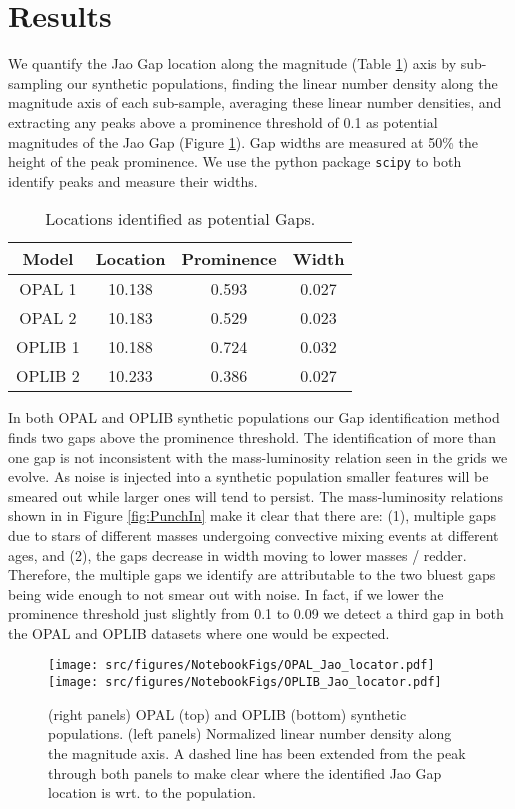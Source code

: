 \section{Results}\label{sec:results}
We quantify the Jao Gap location along the magnitude (Table
\ref{tab:GapLocation}) axis by sub-sampling our synthetic populations, finding
the linear number density along the magnitude axis of each sub-sample,
averaging these linear number densities, and extracting any peaks above a
prominence threshold of 0.1 as potential magnitudes of the Jao Gap (Figure
\ref{fig:JaoGapLocator}). Gap widths are measured at 50\% the height of the peak
prominence. We use the python package \texttt{scipy} \citep{2020SciPy-NMeth} to
both identify peaks and measure their widths. 

\begin{table}
	\centering
	\begin{tabular}{c | c c c}
		\hline
		Model & Location & Prominence & Width\\
		\hline
		\hline
		OPAL 1 & 10.138 & 0.593 & 0.027 \\
		OPAL 2 & 10.183 & 0.529 & 0.023 \\
		OPLIB 1 & 10.188 & 0.724 & 0.032 \\
		OPLIB 2 & 10.233 & 0.386 & 0.027 
	\end{tabular}
	\caption{Locations identified as potential Gaps.}
	\label{tab:GapLocation}
\end{table}

In both OPAL and OPLIB synthetic populations our Gap identification method
finds two gaps above the prominence threshold. The identification of more than
one gap is not inconsistent with the mass-luminosity relation seen in the grids
we evolve. As noise is injected into a synthetic population smaller features will
be smeared out while larger ones will tend to persist. The mass-luminosity
relations shown in in Figure \ref{fig:PunchIn} make it clear that there are: (1),
multiple gaps due to stars of different masses undergoing convective mixing
events at different ages, and (2), the gaps decrease in width moving to lower
masses / redder. Therefore, the multiple gaps we identify are attributable to
the two bluest gaps being wide enough to not smear out with noise. In fact, if
we lower the prominence threshold just slightly from 0.1 to 0.09 we detect a
third gap in both the OPAL and OPLIB datasets where one would be expected.

\begin{figure}
	\centering
	\texttt{[image: src/figures/NotebookFigs/OPAL\_Jao\_locator.pdf]}
	\texttt{[image: src/figures/NotebookFigs/OPLIB\_Jao\_locator.pdf]}
	\caption{(right panels) OPAL (top) and OPLIB (bottom) synthetic
	populations. (left panels) Normalized linear number density along the
	magnitude axis. A dashed line has been extended from the peak through both
	panels to make clear where the identified Jao Gap location is wrt. to the
	population. }
	\label{fig:JaoGapLocator}
\end{figure}

